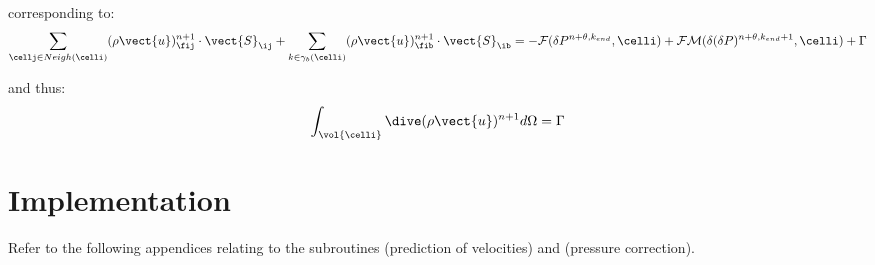 \begin{remark}
corresponding to:
\begin{equation}\notag
\sum\limits_{\cellj \in Neigh(\celli)}(\rho \vect{u})^{n+1}_{\fij} \cdot \vect{S}_{\ij}
+\sum\limits_{k\in {\gamma_b(\celli)}}(\rho\vect{u})^{n+1}_{\fib} \cdot
\vect{S}_{\ib}= -\mathcal{F}(\delta
P^{n+\theta,k_{end}}, \celli)+\mathcal{FM}(\delta(\delta P)^{n+\theta,k_{end}+1},\celli) + \Gamma
\end{equation}

and thus:
\begin{equation}\notag
\int_{\vol{\celli}}{\dive(\rho \vect{u})^{n+1}  d\Omega} = \Gamma
\end{equation}
\end{remark}

\section*{Implementation}

Refer to the following appendices relating to the subroutines
 (prediction of velocities) and 
(pressure correction).
